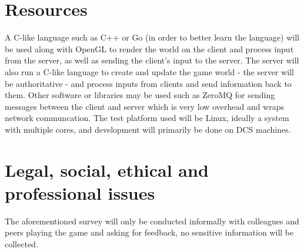\documentclass{article}
\begin{document}
\section{Resources}
	
A C-like language such as C++ or Go \cite{Go} (in order to better learn the language) will be used along with OpenGL to render the world on the client and process input from the server, as well as sending the client's input to the server. The server will also run a C-like language to create and update the game world - the server will be authoritative - and process inputs from clients and send information back to them. Other software or libraries may be used such as ZeroMQ \cite{ZeroMQ} for sending messages between the client and server which is very low overhead and wraps network communcation. The test platform used will be Linux, ideally a system with multiple cores, and development will primarily be done on DCS machines.

\section{Legal, social, ethical and professional issues}

The aforementioned survey will only be conducted informally with colleagues and peers playing the game and asking for feedback, no sensitive information will be collected.



\end{document}
